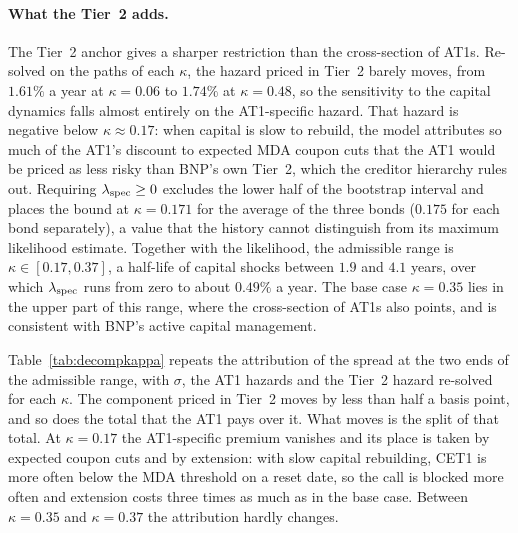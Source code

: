 \paragraph{What the Tier~2 adds.} The Tier~2 anchor gives a sharper restriction than the
cross-section of AT1s. Re-solved on the paths of each $\kappa$, the hazard priced in Tier~2
barely moves, from $1.61\%$ a year at $\kappa=0.06$ to $1.74\%$ at $\kappa=0.48$, so the
sensitivity to the capital dynamics falls almost entirely on the AT1-specific hazard. That
hazard is negative below $\kappa\approx0.17$: when capital is slow to rebuild, the model
attributes so much of the AT1's discount to expected MDA coupon cuts that the AT1 would be
priced as less risky than BNP's own Tier~2, which the creditor hierarchy rules out.
Requiring $\lambda_{\mathrm{spec}}\ge0$ excludes the lower half of the bootstrap interval and places the
bound at $\kappa=0.171$ for the average of the three bonds ($0.175$ for each bond
separately), a value that the history cannot distinguish from its maximum likelihood
estimate. Together with the likelihood, the admissible range is $\kappa\in[0.17,0.37]$, a
half-life of capital shocks between $1.9$ and $4.1$ years, over which $\lambda_{\mathrm{spec}}$ runs from zero
to about $0.49\%$ a year. The base case $\kappa=0.35$ lies in the upper part of this range,
where the cross-section of AT1s also points, and is consistent with BNP's active capital
management.

Table~\ref{tab:decompkappa} repeats the attribution of the spread at the two ends of the
admissible range, with $\sigma$, the AT1 hazards and the Tier~2 hazard re-solved for each
$\kappa$. The component priced in Tier~2 moves by less than half a basis point, and so does
the total that the AT1 pays over it. What moves is the split of that total. At
$\kappa=0.17$ the AT1-specific premium vanishes and its place is taken by expected coupon
cuts and by extension: with slow capital rebuilding, CET1 is more often below the MDA
threshold on a reset date, so the call is blocked more often and extension costs three
times as much as in the base case. Between $\kappa=0.35$ and $\kappa=0.37$ the attribution
hardly changes.

